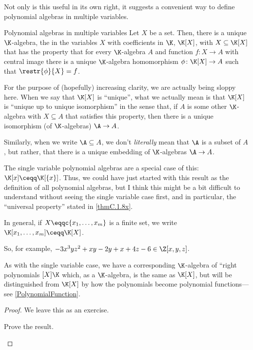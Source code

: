 Not only is this useful in its own right, it suggests a convenient way to define polynomial algebras in multiple variables.
\begin{thm}{Polynomial algebras in multiple variables}{}
	Let $X$ be a set.  Then, there is a unique $\K$-algebra, the  in the variables $X$ with coefficients in $\K$, $\K [X]$\index[notation]{$\K [X]$}, with $X\subseteq \K [X]$ that has the property that for every $\K$-algebra $A$ and function $f\colon X\rightarrow A$ with central image there is a unique $\K$-algebra homomorphism $\phi \colon \K [X]\rightarrow A$ such that $\restr{\phi}{X}=f$.
	\begin{rmk}
		For the purpose of (hopefully) increasing clarity, we are actually being sloppy here.  When we say that $\K [X]$ is ``unique'', what we actually mean is that $\K [X]$ is ``unique up to unique isomorphism'' in the sense that, if $A$ is some other $\K$-algebra with $X\subseteq A$ that satisfies this property, then there is a unique isomorphism (of $\K$-algebras) $\A \rightarrow A$.
		
		Similarly, when we write $\A \subseteq A$, we don't \emph{literally} mean that $\A$ is a subset of $A$, but rather, that there is a unique embedding of $\K$-algebras $\A \rightarrow A$.
	\end{rmk}
	\begin{rmk}
		The single variable polynomial algebras are a special case of this:  $\K [x]\ceqq \K [\{ x\} ]$.  Thus, we could have just started with this result as the definition of all polynomial algebras, but I think this might be a bit difficult to understand without seeing the single variable case first, and in particular, the ``universal property'' stated in \cref{thmC.1.8x}.
	\end{rmk}
	\begin{rmk}
		In general, if $X\eqqc \{ x_1,\ldots ,x_m\}$ is a finite set, we write $\K [x_1,\ldots ,x_m]\ceqq \K [X]$\index[notation]{$\K [x_1,\ldots ,x_m]$}.
	\end{rmk}
	\begin{rmk}
		So, for example, $-3x^3yz^2+xy-2y+x+4z-6\in \Z [x,y,z]$.
	\end{rmk}
	\begin{rmk}
		As with the single variable case, we have a corresponding $\K$-algebra of ``right polynomials $[X]\K$ which, as a $\K$-algebra, is the same as $\K [X]$, but will be distinguished from $\K [X]$ by how the polynomials become polynomial functions---see \cref{PolynomialFunction}.
	\end{rmk}
	\begin{proof}
		We leave this as an exercise.
		\begin{exr}[breakable=false]{}{}
			Prove the result.
		\end{exr}
	\end{proof}
\end{thm}

